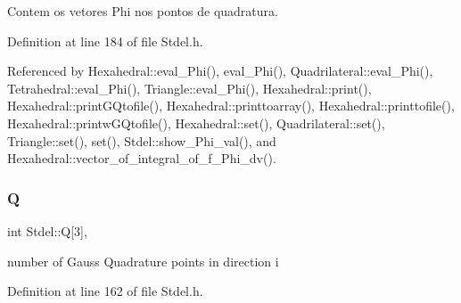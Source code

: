Contem os vetores Phi nos pontos de quadratura. 



Definition at line 184 of file Stdel.\+h.



Referenced by Hexahedral\+::eval\+\_\+\+Phi(), eval\+\_\+\+Phi(), Quadrilateral\+::eval\+\_\+\+Phi(), Tetrahedral\+::eval\+\_\+\+Phi(), Triangle\+::eval\+\_\+\+Phi(), Hexahedral\+::print(), Hexahedral\+::print\+G\+Qtofile(), Hexahedral\+::printtoarray(), Hexahedral\+::printtofile(), Hexahedral\+::printw\+G\+Qtofile(), Hexahedral\+::set(), Quadrilateral\+::set(), Triangle\+::set(), set(), Stdel\+::show\+\_\+\+Phi\+\_\+val(), and Hexahedral\+::vector\+\_\+of\+\_\+integral\+\_\+of\+\_\+f\+\_\+\+Phi\+\_\+dv().

\mbox{\label{classStdel_a82074e598ad5af5ec45a3257a3c2b684}} 
\subsubsection{\texorpdfstring{Q}{Q}}
{\footnotesize\ttfamily int Stdel\+::Q\mbox{[}3\mbox{]}\hspace{0.3cm}{\ttfamily [protected]}, {\ttfamily [inherited]}}



number of Gauss Quadrature points in direction i 



Definition at line 162 of file Stdel.\+h.



